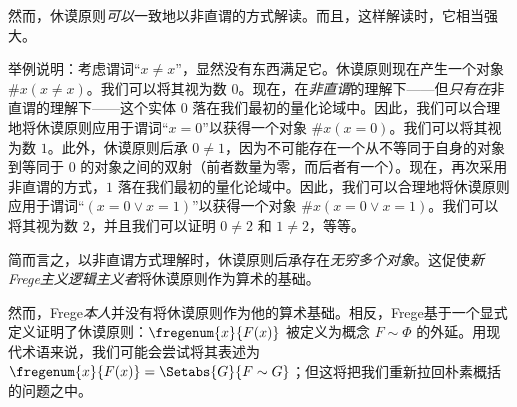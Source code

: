 \documentclass[../../../include/open-logic-section]{subfiles}
\begin{document}
然而，休谟原则\emph{可以}一致地以非直谓的方式解读。而且，这样解读时，它相当强大。

举例说明：考虑谓词“$x \neq x$”，显然没有东西满足它。休谟原则现在产生一个对象 $\# x( x\neq x)$。我们可以将其视为数 $0$。现在，在\emph{非直谓}的理解下——但\emph{只有在}非直谓的理解下——这个实体 $0$ 落在我们最初的量化论域中。因此，我们可以合理地将休谟原则应用于谓词“$x = 0$”以获得一个对象 $\#x (x = 0)$。我们可以将其视为数 $1$。此外，休谟原则后承 $0 \neq 1$，因为不可能存在一个从不等同于自身的对象到等同于 $0$ 的对象之间的双射（前者数量为零，而后者有一个）。现在，再次采用非直谓的方式，$1$ 落在我们最初的量化论域中。因此，我们可以合理地将休谟原则应用于谓词“$(x = 0 \lor x = 1)$”以获得一个对象 $\#x(x = 0 \lor
x = 1)$。我们可以将其视为数 $2$，并且我们可以证明 $0\neq 2$ 和 $1 \neq 2$，等等。

简而言之，以非直谓方式理解时，休谟原则后承存在\emph{无穷多个对象}。这促使\emph{新Frege主义逻辑主义者}将休谟原则作为算术的基础。

然而，Frege\emph{本人}并没有将休谟原则作为他的算术基础。相反，Frege基于一个显式定义证明了休谟原则：$\fregenum{x}{F(x)}$ 被定义为概念 $F \sim \Phi$ 的外延。用现代术语来说，我们可能会尝试将其表述为 $\fregenum{x}{F(x)} = \Setabs{G}{F \sim G}$；但这将把我们重新拉回朴素概括的问题之中。
\end{document}

